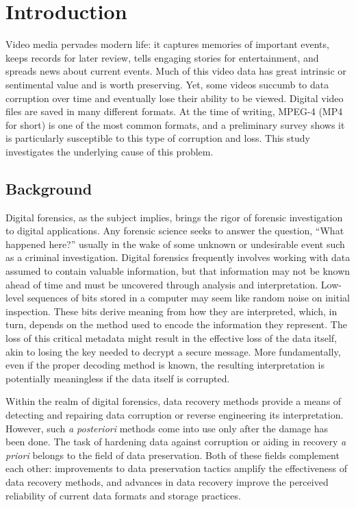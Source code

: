 \chapter{Introduction}
\label{cha:introduction}

Video media pervades modern life: it captures memories of important events, keeps records for later review, tells engaging stories for entertainment, and spreads news about current events. Much of this video data has great intrinsic or sentimental value and is worth preserving. Yet, some videos succumb to data corruption over time and eventually lose their ability to be viewed. Digital video files are saved in many different formats. At the time of writing, MPEG-4 (MP4 for short) is one of the most common formats, and a preliminary survey shows it is particularly susceptible to this type of corruption and loss. This study investigates the underlying cause of this problem.

\section{Background}

Digital forensics, as the subject implies, brings the rigor of forensic investigation to digital applications. Any forensic science seeks to answer the question, ``What happened here?'' usually in the wake of some unknown or undesirable event such as a criminal investigation. Digital forensics frequently involves working with data assumed to contain valuable information, but that information may not be known ahead of time and must be uncovered through analysis and interpretation. Low-level sequences of bits stored in a computer may seem like random noise on initial inspection. These bits derive meaning from how they are interpreted, which, in turn, depends on the method used to encode the information they represent. The loss of this critical metadata might result in the effective loss of the data itself, akin to losing the key needed to decrypt a secure message. More fundamentally, even if the proper decoding method is known, the resulting interpretation is potentially meaningless if the data itself is corrupted.

Within the realm of digital forensics, data recovery methods provide a means of detecting and repairing data corruption or reverse engineering its interpretation. However, such \emph{a posteriori} methods come into use only after the damage has been done. The task of hardening data against corruption or aiding in recovery \emph{a priori} belongs to the field of data preservation. Both of these fields complement each other: improvements to data preservation tactics amplify the effectiveness of data recovery methods, and advances in data recovery improve the perceived reliability of current data formats and storage practices. 

